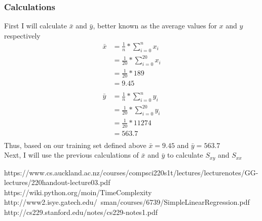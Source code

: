 \documentclass[a4paper]{article}
\begin{document}
\subsubsection{Calculations}
First I will calculate $\bar x$ and $\bar y$, better known as the average values for $x$ and $y$ respectively\\
\begin{align*}
\bar x &= \frac{1}{n} * \sum_{i=0}^{n}x_i\\
&= \frac{1}{20} * \sum_{i=0}^{20}x_i\\
&= \frac{1}{20} * 189\\
&= 9.45\\ \\
\bar y &= \frac{1}{n} * \sum_{i=0}^{n}y_i\\
&= \frac{1}{20} * \sum_{i=0}^{20}y_i\\
&= \frac{1}{20} * 11274\\
&= 563.7\\
\end{align*}
Thus, based on our training set defined above $\bar x = 9.45$ and $\bar y = 563.7$\\
Next, I will use the previous calculations of $\bar x$ and $\bar y$ to calculate $S_{xy}$ and $S_{xx}$

\begin{thebibliography}{9}
https://www.cs.auckland.ac.nz/courses/compsci220s1t/lectures/lecturenotes/GG-lectures/220handout-lecture03.pdf
https://wiki.python.org/moin/TimeComplexity
http://www2.isye.gatech.edu/~sman/courses/6739/SimpleLinearRegression.pdf
http://cs229.stanford.edu/notes/cs229-notes1.pdf
\end{thebibliography}
\end{document}
